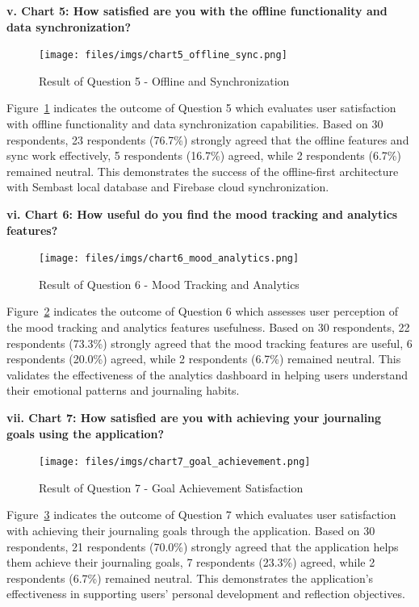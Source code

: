 \textbf{v. Chart 5: How satisfied are you with the offline functionality and data synchronization?}

\begin{figure}[H]
\centering
\texttt{[image: files/imgs/chart5\_offline\_sync.png]}
\caption{Result of Question 5 - Offline and Synchronization}
\label{fig:chart5-offline}
\end{figure}

Figure~\ref{fig:chart5-offline} indicates the outcome of Question 5 which evaluates user satisfaction with offline functionality and data synchronization capabilities. Based on 30 respondents, 23 respondents (76.7\%) strongly agreed that the offline features and sync work effectively, 5 respondents (16.7\%) agreed, while 2 respondents (6.7\%) remained neutral. This demonstrates the success of the offline-first architecture with Sembast local database and Firebase cloud synchronization.

\textbf{vi. Chart 6: How useful do you find the mood tracking and analytics features?}

\begin{figure}[H]
\centering
\texttt{[image: files/imgs/chart6\_mood\_analytics.png]}
\caption{Result of Question 6 - Mood Tracking and Analytics}
\label{fig:chart6-mood}
\end{figure}

Figure~\ref{fig:chart6-mood} indicates the outcome of Question 6 which assesses user perception of the mood tracking and analytics features usefulness. Based on 30 respondents, 22 respondents (73.3\%) strongly agreed that the mood tracking features are useful, 6 respondents (20.0\%) agreed, while 2 respondents (6.7\%) remained neutral. This validates the effectiveness of the analytics dashboard in helping users understand their emotional patterns and journaling habits.

\textbf{vii. Chart 7: How satisfied are you with achieving your journaling goals using the application?}

\begin{figure}[H]
\centering
\texttt{[image: files/imgs/chart7\_goal\_achievement.png]}
\caption{Result of Question 7 - Goal Achievement Satisfaction}
\label{fig:chart7-goals}
\end{figure}

Figure~\ref{fig:chart7-goals} indicates the outcome of Question 7 which evaluates user satisfaction with achieving their journaling goals through the application. Based on 30 respondents, 21 respondents (70.0\%) strongly agreed that the application helps them achieve their journaling goals, 7 respondents (23.3\%) agreed, while 2 respondents (6.7\%) remained neutral. This demonstrates the application's effectiveness in supporting users' personal development and reflection objectives.

